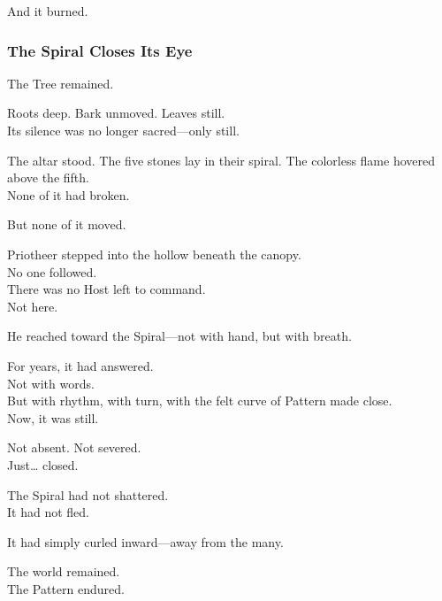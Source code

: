 \documentclass[12pt]{article}
\begin{document}
\vspace{0.5em}
And it burned.

\dotfill

\subsubsection{The Spiral Closes Its Eye}

The Tree remained.

\vspace{0.5em}
Roots deep. Bark unmoved. Leaves still.\\
Its silence was no longer sacred---only still.

\vspace{0.5em}
The altar stood. The five stones lay in their spiral. The colorless flame hovered above the fifth.\\
None of it had broken.

\vspace{0.5em}
But none of it moved.

\vspace{0.5em}
Priotheer stepped into the hollow beneath the canopy.\\
No one followed.\\
There was no Host left to command.\\
Not here.

\vspace{0.5em}
He reached toward the Spiral---not with hand, but with breath.

\vspace{0.5em}
For years, it had answered.\\
Not with words.\\
But with rhythm, with turn, with the felt curve of Pattern made close.\\
Now, it was still.

\vspace{0.5em}
Not absent. Not severed.\\
Just\ldots{} closed.

\vspace{0.5em}
The Spiral had not shattered.\\
It had not fled.

\vspace{0.5em}
It had simply curled inward---away from the many.

\vspace{0.5em}
The world remained.\\
The Pattern endured.
\end{document}
